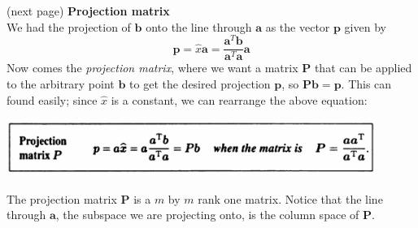 \documentclass{report}
\begin{document}
(next page)\newpage
\noindent\textbf{Projection matrix}\\
We had the projection of $\bm b$ onto the line through $\bm a$ as the vector $\bm p$ given by
\begin{equation*}
\bm p=\hat{x}\bm a=\frac{\bm a^T\bm b}{\bm a^T\bm a}\bm a
\end{equation*}
Now comes the \textit{projection matrix}, where we want a matrix $\bm P$ that can be applied to the arbitrary point $\bm b$ to get the desired projection $\bm p$, so 
$\bm{Pb}=\bm p$. This can found easily; since $\hat{x}$ is a constant, we can rearrange the above equation:
\begin{center}
\includegraphics[width=12cm]{57}
\end{center}
The projection matrix $\bm P$ is a $m$ by $m$ rank one matrix. Notice that the line through $\bm a$, the subspace we are projecting onto, is the column space of $\bm P$.
\end{document}
